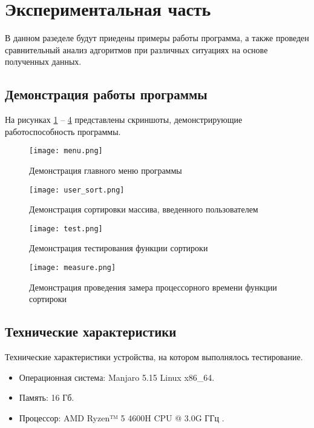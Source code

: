 \section{Экспериментальная часть}
В данном разеделе будут приедены примеры работы программа, а также проведен
сравнительный анализ адгоритмов при различных ситуациях на основе полученных
данных.

\subsection{Демонстрация работы программы}
На рисунках \ref{main_menu} -- \ref{fmeasure} представлены скриншоты,
демонстрирующие работоспособность программы.

\begin{figure}[!h]
    \texttt{[image: menu.png]}
    \caption{Демонстрация главного меню программы}
    \label{main_menu}
\end{figure}

\begin{figure}[!h]
    \texttt{[image: user\_sort.png]}
    \caption{Демонстрация сортировки массива, введенного пользователем}
    \label{user_sort}
\end{figure}
\pagebreak

\begin{figure}[!h]
    \texttt{[image: test.png]}
    \caption{Демонстрация тестирования функции сортироки}
    \label{ftest}
\end{figure}
\pagebreak

\begin{figure}[!h]
    \texttt{[image: measure.png]}
    \caption{Демонстрация проведения замера процессорного времени функции
             сортироки}
    \label{fmeasure}
\end{figure}

\subsection{Технические характеристики}

Технические характеристики устройства, на котором выполнялось тестирование.

\begin{itemize}
    \item Операционная система: Manjaro 5.15 \cite{Manjaro} Linux \cite{Linux} x86\_64.
    \item Память: 16 Гб.
    \item Процессор: AMD Ryzen™ 5 4600H CPU @ 3.0G ГГц \cite{AMD_CPU}.
\end{itemize}

